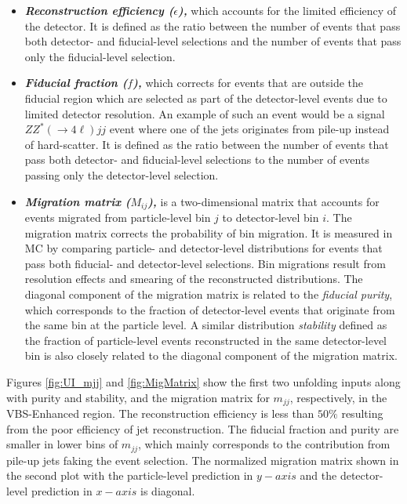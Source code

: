 \begin{itemize}
    \item{\textit{\textbf{Reconstruction efficiency ($\epsilon$),}} which accounts for the limited efficiency of the detector. It is defined as the ratio between the number of events that pass both detector- and fiducial-level selections and the number of events that pass only the fiducial-level selection. }
    
    \item{\textit{\textbf{Fiducial fraction ($f$),}} which corrects for events that are outside the fiducial region which are selected as part of the detector-level events due to limited detector resolution. An example of such an event would be a signal $ZZ^*(\rightarrow 4\ell) jj$ event where one of the jets originates from pile-up instead of hard-scatter. It is defined as the ratio between the number of events that pass both detector- and fiducial-level selections to the number of events passing only the detector-level selection. }
    
    \item{\textit{\textbf{Migration matrix ($M_{ij}$),}} is a two-dimensional matrix that accounts for events migrated from particle-level bin $j$ to detector-level bin $i$. The migration matrix corrects the probability of bin migration. It is measured in MC by comparing particle- and detector-level distributions for events that pass both fiducial- and detector-level selections. Bin migrations result from resolution effects and smearing of the reconstructed distributions. The diagonal component of the migration matrix is related to the \textit{fiducial purity}, which corresponds to the fraction of detector-level events that originate from the same bin at the particle level. A similar distribution \textit{stability} defined as the fraction of particle-level events reconstructed in the same detector-level bin is also closely related to the diagonal component of the migration matrix. }
\end{itemize}

Figures \ref{fig:UI_mjj} and \ref{fig:MigMatrix} show the first two unfolding inputs along with purity and stability, and the migration matrix for $m_{jj}$, respectively, in the VBS-Enhanced region. The reconstruction efficiency is less than $50\%$ resulting from the poor efficiency of jet reconstruction. The fiducial fraction and purity are smaller in lower bins of $m_{jj}$, which mainly corresponds to the contribution from pile-up jets faking the event selection. The normalized migration matrix shown in the second plot with the particle-level prediction in $y-axis$ and the detector-level prediction in $x-axis$ is diagonal.


